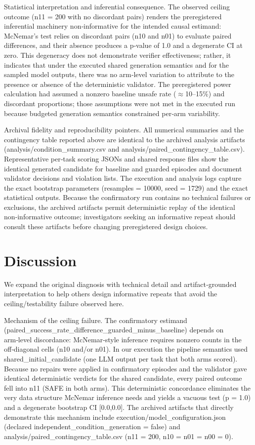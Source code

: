 \documentclass[conference]{IEEEtran}
\begin{document}
Statistical interpretation and inferential consequence. The observed ceiling outcome (n11 = 200 with no discordant pairs) renders the preregistered inferential machinery non‑informative for the intended causal estimand: McNemar's test relies on discordant pairs (n10 and n01) to evaluate paired differences, and their absence produces a p‑value of 1.0 and a degenerate CI at zero. This degeneracy does not demonstrate verifier effectiveness; rather, it indicates that under the executed shared generation semantics and for the sampled model outputs, there was no arm‑level variation to attribute to the presence or absence of the deterministic validator. The preregistered power calculation had assumed a nonzero baseline unsafe rate (\ensuremath{\approx}10--15\%) and discordant proportions; those assumptions were not met in the executed run because budgeted generation semantics constrained per‑arm variability.

Archival fidelity and reproducibility pointers. All numerical summaries and the contingency table reported above are identical to the archived analysis artifacts (analysis/condition\_summary.csv and analysis/paired\_contingency\_table.csv). Representative per‑task scoring JSONs and shared response files show the identical generated candidate for baseline and guarded episodes and document validator decisions and violation lists. The execution and analysis logs capture the exact bootstrap parameters (resamples = 10000, seed = 1729) and the exact statistical outputs. Because the confirmatory run contains no technical failures or exclusions, the archived artifacts permit deterministic replay of the identical non‑informative outcome; investigators seeking an informative repeat should consult these artifacts before changing preregistered design choices.

\section{Discussion}
We expand the original diagnosis with technical detail and artifact‑grounded interpretation to help others design informative repeats that avoid the ceiling/testability failure observed here.

Mechanism of the ceiling failure. The confirmatory estimand (paired\_success\_rate\_difference\_guarded\_minus\_baseline) depends on arm‑level discordance: McNemar‑style inference requires nonzero counts in the off‑diagonal cells (n10 and/or n01). In our execution the pipeline semantics used shared\_initial\_candidate (one LLM output per task that both arms scored). Because no repairs were applied in confirmatory episodes and the validator gave identical deterministic verdicts for the shared candidate, every paired outcome fell into n11 (SAFE in both arms). This deterministic concordance eliminates the very data structure McNemar inference needs and yields a vacuous test (p = 1.0) and a degenerate bootstrap CI [0.0,0.0]. The archived artifacts that directly demonstrate this mechanism include execution/model\_configuration.json (declared independent\_condition\_generation = false) and analysis/paired\_contingency\_table.csv (n11 = 200, n10 = n01 = n00 = 0).
\end{document}

